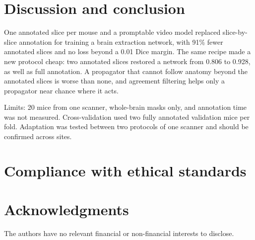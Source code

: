 \section{Discussion and conclusion}
\label{sec:discussion}
One annotated slice per mouse and a promptable video model replaced slice-by-slice annotation for training a brain extraction network, with 91\% fewer annotated slices and no loss beyond a 0.01 Dice margin. The same recipe made a new protocol cheap: two annotated slices restored a network from 0.806 to 0.928, as well as full annotation. A propagator that cannot follow anatomy beyond the annotated slices is worse than none, and agreement filtering helps only a propagator near chance where it acts.

Limits: 20 mice from one scanner, whole-brain masks only, and annotation time was not measured. Cross-validation used two fully annotated validation mice per fold. Adaptation was tested between two protocols of one scanner and should be confirmed across sites.

\section{Compliance with ethical standards}
\label{sec:ethics}

\section{Acknowledgments}
\label{sec:acknowledgments}
 The authors have no relevant financial or non-financial interests to disclose.

